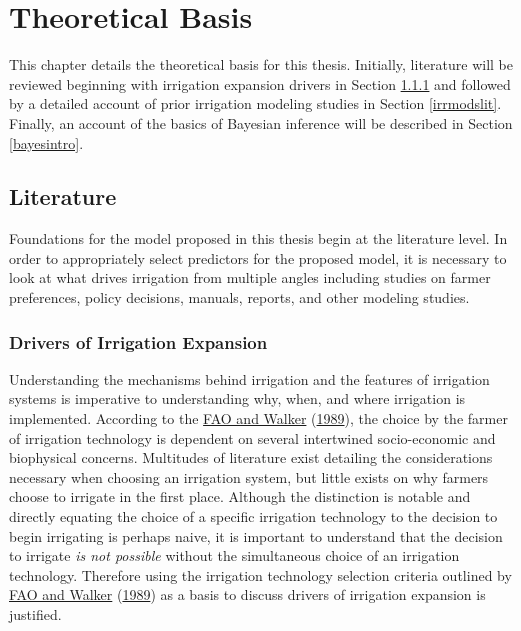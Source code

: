 \documentclass[12pt,twoside]{reedthesis}
\begin{document}
\hypertarget{Theory}{%
\chapter{Theoretical Basis}\label{Theory}}

This chapter details the theoretical basis for this thesis. Initially, literature will be reviewed beginning with irrigation expansion drivers in Section \ref{drivers} and followed by a detailed account of prior irrigation modeling studies in Section \ref{irrmodslit}. Finally, an account of the basics of Bayesian inference will be described in Section \ref{bayesintro}.

\hypertarget{lit}{%
\section{Literature}\label{lit}}

Foundations for the model proposed in this thesis begin at the literature level. In order to appropriately select predictors for the proposed model, it is necessary to look at what drives irrigation from multiple angles including studies on farmer preferences, policy decisions, manuals, reports, and other modeling studies.

\hypertarget{drivers}{%
\subsection{Drivers of Irrigation Expansion}\label{drivers}}

Understanding the mechanisms behind irrigation and the features of irrigation systems is imperative to understanding why, when, and where irrigation is implemented. According to the \protect\hyperlink{ref-faoGuidelinesDesigningEvaluating1989}{FAO and Walker} (\protect\hyperlink{ref-faoGuidelinesDesigningEvaluating1989}{1989}), the choice by the farmer of irrigation technology is dependent on several intertwined socio-economic and biophysical concerns. Multitudes of literature exist detailing the considerations necessary when choosing an irrigation system, but little exists on why farmers choose to irrigate in the first place. Although the distinction is notable and directly equating the choice of a specific irrigation technology to the decision to begin irrigating is perhaps naive, it is important to understand that the decision to irrigate \emph{is not possible} without the simultaneous choice of an irrigation technology. Therefore using the irrigation technology selection criteria outlined by \protect\hyperlink{ref-faoGuidelinesDesigningEvaluating1989}{FAO and Walker} (\protect\hyperlink{ref-faoGuidelinesDesigningEvaluating1989}{1989}) as a basis to discuss drivers of irrigation expansion is justified.
\end{document}
